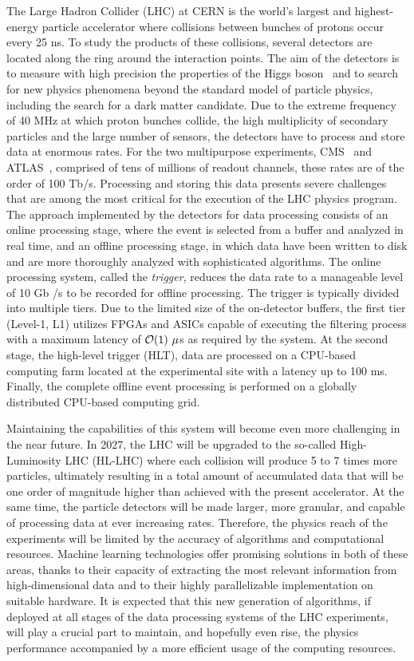 The Large Hadron Collider (LHC) at CERN is the world's largest and highest-energy particle accelerator where collisions between bunches of protons occur every 25 ns. To study the products of these collisions, several detectors are located along the ring around the interaction points. The aim of the detectors is to measure with high precision the properties of the Higgs boson~\cite{Aad:2012tfa,Chatrchyan:2012ufa} and to search for new physics phenomena beyond the standard model of particle physics, including the search for a dark matter candidate.
Due to the extreme frequency of 40 MHz at which proton bunches collide, the high multiplicity of secondary particles and the large number of sensors, the detectors have to process and store data at enormous rates. For the two multipurpose experiments, CMS~\cite{Collaboration_2008} and ATLAS~\cite{Collaboration_2008}, comprised of tens of millions of readout channels, these rates are of the order of 100 Tb/s. Processing and storing this data presents severe challenges that are among the most critical for the execution of the LHC physics program. 
The approach implemented by the detectors for data processing consists of an online processing stage, where the event is selected from a buffer and analyzed in real time, and an offline processing stage, in which data have been written to disk and are more thoroughly analyzed with sophisticated algorithms. The online processing system, called the \emph{trigger}, reduces the data rate to a manageable level of 10 Gb /s to be recorded for offline processing. The trigger is typically divided into multiple tiers. Due to the limited size of the on-detector buffers, the first tier (Level-1, L1) utilizes FPGAs and ASICs capable of executing the filtering process with a maximum latency of ${\cal O}(1)~\mu$s as required by the system. At the second stage, the high-level trigger (HLT), data are processed on a CPU-based computing farm located at the experimental site with a latency up to 100 ms. Finally, the complete offline event processing is performed on a globally distributed CPU-based computing grid.

Maintaining the capabilities of this system will become even more challenging in the near future.
In 2027, the LHC will be upgraded to the so-called High-Luminosity LHC (HL-LHC) where each collision will produce 5 to 7 times more particles, ultimately resulting in a total amount of accumulated data that will be one order of magnitude higher than achieved with the present accelerator. At the same time, the particle detectors will be made larger, more granular, and capable of processing data at ever increasing rates. Therefore, the physics reach of the experiments will be limited by the accuracy of algorithms and computational resources. 
Machine learning technologies offer promising solutions in both of these areas, thanks to their capacity of extracting the most relevant information from high-dimensional data and to their highly parallelizable implementation on suitable hardware.
It is expected that this new generation of algorithms, if deployed at all stages of the data processing systems of the LHC experiments, will play a crucial part to maintain, and hopefully even rise, the physics performance accompanied by a more efficient usage of the computing resources.

